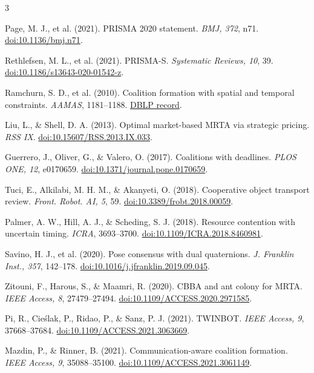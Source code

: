 \documentclass[10pt,letterpaper]{article}
\newcommand{\subh}[1]{\par\vspace{1.6pt}{\sffamily\fontsize{8.9}{9.5}\selectfont\bfseries\color{orange}#1\par}\vspace{.3pt}}
\begin{document}
\subh{Referencias verificadas y fuentes primarias}
\fontsize{4.65}{5.15}\selectfont
\setlength{\columnsep}{4.2mm}
\begin{multicols}{3}
\begin{enumerate}[label={[\arabic*]},leftmargin=3.6mm]
\item Page, M. J., et al. (2021). PRISMA 2020 statement. \emph{BMJ, 372}, n71. \href{https://doi.org/10.1136/bmj.n71}{doi:10.1136/bmj.n71}.
\item Rethlefsen, M. L., et al. (2021). PRISMA-S. \emph{Systematic Reviews, 10}, 39. \href{https://doi.org/10.1186/s13643-020-01542-z}{doi:10.1186/s13643-020-01542-z}.
\item Ramchurn, S. D., et al. (2010). Coalition formation with spatial and temporal constraints. \emph{AAMAS}, 1181--1188. \href{https://dblp.org/rec/conf/atal/RamchurnPFTJ10}{DBLP record}.
\item Liu, L., \& Shell, D. A. (2013). Optimal market-based MRTA via strategic pricing. \emph{RSS IX}. \href{https://doi.org/10.15607/RSS.2013.IX.033}{doi:10.15607/RSS.2013.IX.033}.
\item Guerrero, J., Oliver, G., \& Valero, O. (2017). Coalitions with deadlines. \emph{PLOS ONE, 12}, e0170659. \href{https://doi.org/10.1371/journal.pone.0170659}{doi:10.1371/journal.pone.0170659}.
\item Tuci, E., Alkilabi, M. H. M., \& Akanyeti, O. (2018). Cooperative object transport review. \emph{Front. Robot. AI, 5}, 59. \href{https://doi.org/10.3389/frobt.2018.00059}{doi:10.3389/frobt.2018.00059}.
\item Palmer, A. W., Hill, A. J., \& Scheding, S. J. (2018). Resource contention with uncertain timing. \emph{ICRA}, 3693--3700. \href{https://doi.org/10.1109/ICRA.2018.8460981}{doi:10.1109/ICRA.2018.8460981}.
\item Savino, H. J., et al. (2020). Pose consensus with dual quaternions. \emph{J. Franklin Inst., 357}, 142--178. \href{https://doi.org/10.1016/j.jfranklin.2019.09.045}{doi:10.1016/j.jfranklin.2019.09.045}.
\item Zitouni, F., Harous, S., \& Maamri, R. (2020). CBBA and ant colony for MRTA. \emph{IEEE Access, 8}, 27479--27494. \href{https://doi.org/10.1109/ACCESS.2020.2971585}{doi:10.1109/ACCESS.2020.2971585}.
\item Pi, R., Cieślak, P., Ridao, P., \& Sanz, P. J. (2021). TWINBOT. \emph{IEEE Access, 9}, 37668--37684. \href{https://doi.org/10.1109/ACCESS.2021.3063669}{doi:10.1109/ACCESS.2021.3063669}.
\item Mazdin, P., \& Rinner, B. (2021). Communication-aware coalition formation. \emph{IEEE Access, 9}, 35088--35100. \href{https://doi.org/10.1109/ACCESS.2021.3061149}{doi:10.1109/ACCESS.2021.3061149}.

\end{enumerate}
\end{multicols}
\end{document}
